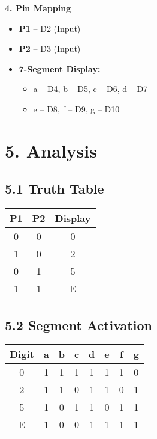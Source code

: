 \documentclass[12pt]{article}
\begin{document}
\begin{multicols}{2}
\vspace{1em}
\noindent\textbf{4. Pin Mapping}
\begin{itemize}
    \item \textbf{P1} – D2 (Input)
    \item \textbf{P2} – D3 (Input)
    \item \textbf{7-Segment Display:}
    \begin{itemize}
        \item a – D4, b – D5, c – D6, d – D7
        \item e – D8, f – D9, g – D10
    \end{itemize}
\end{itemize}

\vspace{15em}


\end{multicols}


\vspace{1em}
\section*{5. Analysis}
\subsection*{5.1 Truth Table}
\begin{table}[H]
\centering
\begin{tabular}{|c|c|c|}
\hline
\textbf{P1} & \textbf{P2} & \textbf{Display} \\
\hline
0 & 0 & 0 \\
1 & 0 & 2 \\
0 & 1 & 5 \\
1 & 1 & E \\
\hline
\end{tabular}
\end{table}

\subsection*{5.2 Segment Activation}
\begin{table}[H]
\centering
\small
\begin{tabular}{|c|c|c|c|c|c|c|c|}
\hline
\textbf{Digit} & a & b & c & d & e & f & g \\
\hline
0 & 1 & 1 & 1 & 1 & 1 & 1 & 0 \\
2 & 1 & 1 & 0 & 1 & 1 & 0 & 1 \\
5 & 1 & 0 & 1 & 1 & 0 & 1 & 1 \\
E & 1 & 0 & 0 & 1 & 1 & 1 & 1 \\
\hline
\end{tabular}
\end{table}
\end{document}
